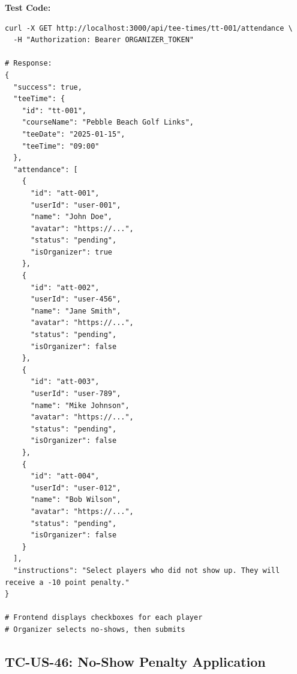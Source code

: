 \documentclass[11pt,a4paper]{article}
\begin{document}
\vspace{0.3cm}
\textbf{Test Code:}
\begin{lstlisting}
curl -X GET http://localhost:3000/api/tee-times/tt-001/attendance \
  -H "Authorization: Bearer ORGANIZER_TOKEN"

# Response:
{
  "success": true,
  "teeTime": {
    "id": "tt-001",
    "courseName": "Pebble Beach Golf Links",
    "teeDate": "2025-01-15",
    "teeTime": "09:00"
  },
  "attendance": [
    {
      "id": "att-001",
      "userId": "user-001",
      "name": "John Doe",
      "avatar": "https://...",
      "status": "pending",
      "isOrganizer": true
    },
    {
      "id": "att-002",
      "userId": "user-456",
      "name": "Jane Smith",
      "avatar": "https://...",
      "status": "pending",
      "isOrganizer": false
    },
    {
      "id": "att-003",
      "userId": "user-789",
      "name": "Mike Johnson",
      "avatar": "https://...",
      "status": "pending",
      "isOrganizer": false
    },
    {
      "id": "att-004",
      "userId": "user-012",
      "name": "Bob Wilson",
      "avatar": "https://...",
      "status": "pending",
      "isOrganizer": false
    }
  ],
  "instructions": "Select players who did not show up. They will receive a -10 point penalty."
}

# Frontend displays checkboxes for each player
# Organizer selects no-shows, then submits
\end{lstlisting}

\vspace{0.5cm}


\subsection{TC-US-46: No-Show Penalty Application}
\end{document}
